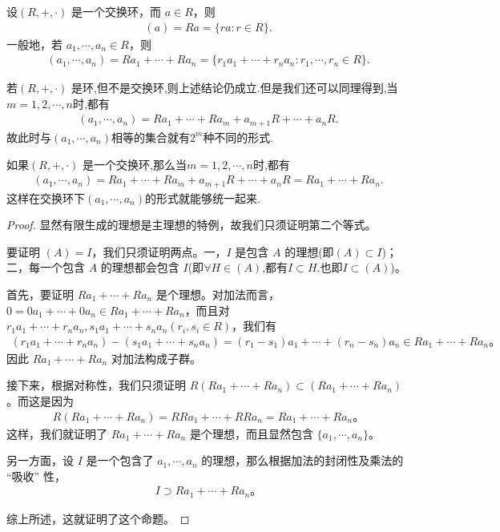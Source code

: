 \documentclass[../../main.tex]{subfiles}
\begin{document}
\begin{proposition}\label{proposition:生成的理想的集合表示}
设$(R, +, \cdot)$ 是一个交换环，而 $a \in R$，则
\begin{align*}
(a) = Ra = \{ra : r \in R\}.
\end{align*}
一般地，若 $a_1, \cdots, a_n \in R$，则
\begin{align*}
(a_1, \cdots, a_n) = Ra_1 + \cdots + Ra_n = \{r_1a_1 + \cdots + r_na_n : r_1, \cdots, r_n \in R\} .
\end{align*}
\end{proposition}
\begin{remark}
若$(R, +, \cdot)$ 是环,但不是交换环,则上述结论仍成立.但是我们还可以同理得到,当$m=1,2,\cdots,n$时,都有
\begin{align*}
\left( a_1,\cdots ,a_n \right) =Ra_1+\cdots +Ra_m+a_{m+1}R+\cdots +a_nR.
\end{align*}
故此时与$(a_1,\cdots,a_n)$相等的集合就有$2^m$种不同的形式.

如果$(R, +, \cdot)$ 是一个交换环,那么当$m=1,2,\cdots,n$时,都有
\begin{align*}
\left( a_1,\cdots ,a_n \right) =Ra_1+\cdots +Ra_m+a_{m+1}R+\cdots +a_nR=Ra_1 + \cdots + Ra_n.
\end{align*}
这样在交换环下$(a_1,\cdots,a_n)$的形式就能够统一起来.
\end{remark}
\begin{proof}
显然有限生成的理想是主理想的特例，故我们只须证明第二个等式。

要证明 $(A) = I$，我们只须证明两点。一，$I$ 是包含 $A$ 的理想(即$(A)\subset I$)；二，每一个包含 $A$ 的理想都会包含 $I$(即$\forall H\in (A)$,都有$I\subset H$.也即$I\subset (A)$)。

首先，要证明 $Ra_1 + \cdots + Ra_n$ 是个理想。对加法而言，$0 = 0a_1 + \cdots + 0a_n \in Ra_1 + \cdots + Ra_n$，而且对 $r_1a_1 + \cdots + r_na_n, s_1a_1 + \cdots + s_na_n (r_i, s_i \in R)$，我们有
\begin{align*}
(r_1a_1 + \cdots + r_na_n) - (s_1a_1 + \cdots + s_na_n) = (r_1 - s_1)a_1 + \cdots + (r_n - s_n)a_n \in Ra_1 + \cdots + Ra_n 。
\end{align*}
因此 $Ra_1 + \cdots + Ra_n$ 对加法构成子群。

接下来，根据对称性，我们只须证明 $R(Ra_1 + \cdots + Ra_n) \subset (Ra_1 + \cdots + Ra_n)$。而这是因为
\begin{align*}
R(Ra_1 + \cdots + Ra_n) = RRa_1 + \cdots + RRa_n = Ra_1 + \cdots + Ra_n 。
\end{align*}
这样，我们就证明了 $Ra_1 + \cdots + Ra_n$ 是个理想，而且显然包含 $\{a_1, \cdots, a_n\}$。

另一方面，设 $I$ 是一个包含了 $a_1, \cdots, a_n$ 的理想，那么根据加法的封闭性及乘法的 “吸收” 性，
\begin{align*}
I \supset Ra_1 + \cdots + Ra_n 。
\end{align*}

综上所述，这就证明了这个命题。 
\end{proof}
\end{document}
